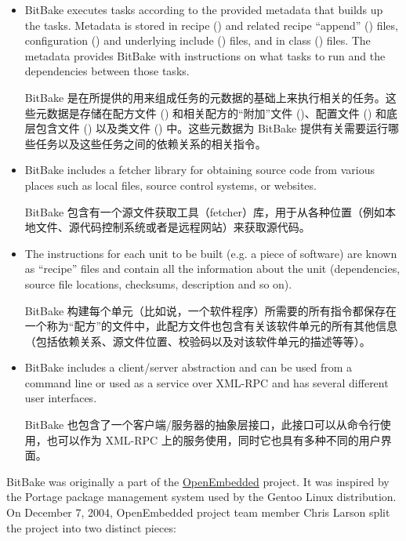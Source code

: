 \begin{itemize}
\setlength\itemsep{1.0em}

 \item BitBake executes tasks according to the provided metadata that builds up the tasks. Metadata is stored in recipe () and related recipe ``append'' () files, configuration () and underlying include () files, and in class () files. The metadata provides BitBake with instructions on what tasks to run and the dependencies between those tasks.
 
 \medskip
 BitBake 是在所提供的用来组成任务的元数据的基础上来执行相关的任务。这些元数据是存储在配方文件 () 和相关配方的“附加”文件 ()、配置文件 () 和底层包含文件 () 以及类文件 () 中。这些元数据为 BitBake 提供有关需要运行哪些任务以及这些任务之间的依赖关系的相关指令。

 \item BitBake includes a fetcher library for obtaining source code from various places such as local files, source control systems, or websites.
 
 \medskip
 BitBake 包含有一个源文件获取工具（fetcher）库，用于从各种位置（例如本地文件、源代码控制系统或者是远程网站）来获取源代码。

 \item The instructions for each unit to be built (e.g. a piece of software) are known as ``recipe'' files and contain all the information about the unit (dependencies, source file locations, checksums, description and so on).
 
 \medskip
 BitBake 构建每个单元（比如说，一个软件程序）所需要的所有指令都保存在一个称为``配方''的文件中，此配方文件也包含有关该软件单元的所有其他信息（包括依赖关系、源文件位置、校验码以及对该软件单元的描述等等）。

 \item BitBake includes a client/server abstraction and can be used from a command line or used as a service over XML-RPC and has several different user interfaces.
 
 \medskip
 BitBake 也包含了一个客户端/服务器的抽象层接口，此接口可以从命令行使用，也可以作为 XML-RPC 上的服务使用，同时它也具有多种不同的用户界面。

\end{itemize}


BitBake was originally a part of the \href{https://www.openembedded.org/}{OpenEmbedded} project. It was inspired by the Portage package management system used by the Gentoo Linux distribution. On December 7, 2004, OpenEmbedded project team member Chris Larson split the project into two distinct pieces:

